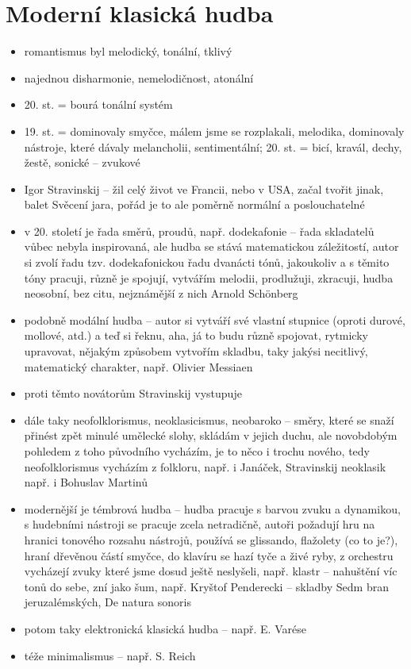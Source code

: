 \documentclass{article}
\begin{document}
\part{Moderní klasická hudba}
\begin{itemize}
  \item romantismus byl melodický, tonální, tklivý
  \item najednou disharmonie, nemelodičnost, atonální
  \item 20. st. = bourá tonální systém
  \item 19. st. = dominovaly smyčce, málem jsme se rozplakali, melodika, dominovaly nástroje, které dávaly melancholii, sentimentální; 20. st. = bicí, kravál, dechy, žestě, sonické -- zvukové
  \item Igor Stravinskij -- žil celý život ve Francii, nebo v USA, začal tvořit jinak, balet Svěcení jara, pořád je to ale poměrně normální a poslouchatelné
  \item v 20. století je řada směrů, proudů, např. dodekafonie -- řada skladatelů vůbec nebyla inspirovaná, ale hudba se stává matematickou záležitostí, autor si zvolí řadu tzv. dodekafonickou řadu dvanácti tónů, jakoukoliv a s těmito tóny pracuji, různě je spojují, vytvářím melodii, prodlužuji, zkracuji, hudba neosobní, bez citu, nejznámější z nich Arnold Schönberg
  \item podobně modální hudba -- autor si vytváří své vlastní stupnice (oproti durové, mollové, atd.) a teď si řeknu, aha, já to budu různě spojovat, rytmicky upravovat, nějakým způsobem vytvořím skladbu, taky jakýsi necitlivý, matematický charakter, např. Olivier Messiaen
  \item proti těmto novátorům Stravinskij vystupuje
  \item dále taky neofolklorismus, neoklasicismus, neobaroko -- směry, které se snaží přinést zpět minulé umělecké slohy, skládám v jejich duchu, ale novobdobým pohledem z toho původního vycházím, je to něco i trochu nového, tedy neofolklorismus vycházím z folkloru, např. i Janáček, Stravinskij neoklasik např. i Bohuslav Martinů
  \item modernější je témbrová hudba -- hudba pracuje s barvou zvuku a dynamikou, s hudebními nástroji se pracuje zcela netradičně, autoři požadují hru na hranici tonového rozsahu nástrojů, používá se glissando, flažolety (co to je?), hraní dřevěnou částí smyčce, do klavíru se hazí tyče a živé ryby, z orchestru vycházejí zvuky které jsme dosud ještě neslyšeli, např. klastr -- nahuštění víc tonů do sebe, zní jako šum, např. Kryštof Penderecki -- skladby Sedm bran jeruzalémských, De natura sonoris
  \item potom taky elektronická klasická hudba -- např. E. Varése
  \item téže minimalismus -- např. S. Reich
\end{itemize}
\end{document}
